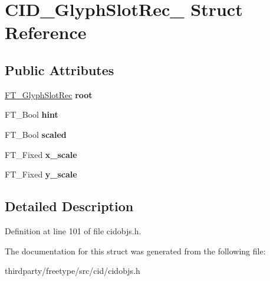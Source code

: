 \hypertarget{struct_c_i_d___glyph_slot_rec__}{}\section{C\+I\+D\+\_\+\+Glyph\+Slot\+Rec\+\_\+ Struct Reference}
\label{struct_c_i_d___glyph_slot_rec__}
\subsection*{Public Attributes}
\begin{DoxyCompactItemize}
\item 
\mbox{\label{struct_c_i_d___glyph_slot_rec___ae4925cb531f6110d5a2b9003b8b823b8}} 
\hyperlink{struct_f_t___glyph_slot_rec__}{F\+T\+\_\+\+Glyph\+Slot\+Rec} {\bfseries root}
\item 
\mbox{\label{struct_c_i_d___glyph_slot_rec___a181e1e10b1e4c190fe48ab268b644938}} 
F\+T\+\_\+\+Bool {\bfseries hint}
\item 
\mbox{\label{struct_c_i_d___glyph_slot_rec___abcfc4017a999cb47c3a7539b5c71c784}} 
F\+T\+\_\+\+Bool {\bfseries scaled}
\item 
\mbox{\label{struct_c_i_d___glyph_slot_rec___a108cd3d4a0f50b3ee6ea049f8ad0e55c}} 
F\+T\+\_\+\+Fixed {\bfseries x\+\_\+scale}
\item 
\mbox{\label{struct_c_i_d___glyph_slot_rec___a979657334d0c710434e86d89e6d9ffcd}} 
F\+T\+\_\+\+Fixed {\bfseries y\+\_\+scale}
\end{DoxyCompactItemize}


\subsection{Detailed Description}


Definition at line 101 of file cidobjs.\+h.



The documentation for this struct was generated from the following file\+:\begin{DoxyCompactItemize}
\item 
thirdparty/freetype/src/cid/cidobjs.\+h\end{DoxyCompactItemize}
